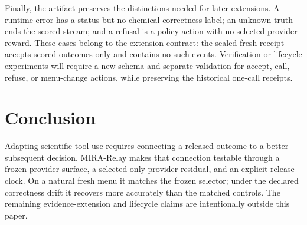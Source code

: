 \documentclass[sigconf,anonymous]{aamas}
\begin{document}
Finally, the artifact preserves the distinctions needed for later extensions. A runtime error has a status but no chemical-correctness label; an unknown truth ends the scored stream; and a refusal is a policy action with no selected-provider reward. These cases belong to the extension contract: the sealed fresh receipt accepts scored outcomes only and contains no such events. Verification or lifecycle experiments will require a new schema and separate validation for accept, call, refuse, or menu-change actions, while preserving the historical one-call receipts.

\section{Conclusion}
Adapting scientific tool use requires connecting a released outcome to a better subsequent decision. MIRA-Relay makes that connection testable through a frozen provider surface, a selected-only provider residual, and an explicit release clock. On a natural fresh menu it matches the frozen selector; under the declared correctness drift it recovers more accurately than the matched controls. The remaining evidence-extension and lifecycle claims are intentionally outside this paper.

\clearpage
\balance


\end{document}
